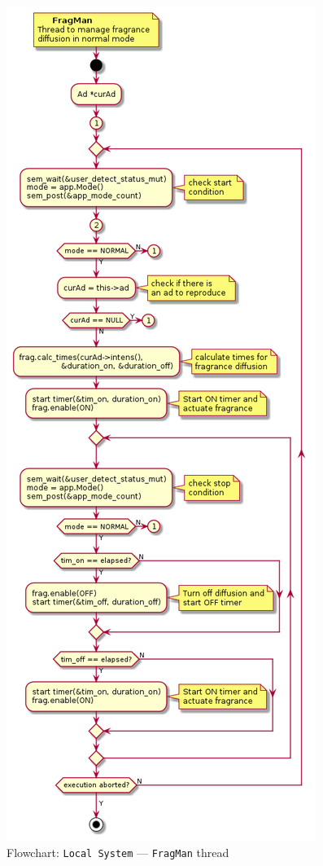 \begin{figure}[htb!]
\centering
    \includegraphics[width=0.6\columnwidth]{./img/flow-local-frag-man.png}
  \caption{Flowchart: \texttt{Local System} --- \texttt{FragMan} thread}%
\label{fig:flow-local-frag-man}
\end{figure}
%
